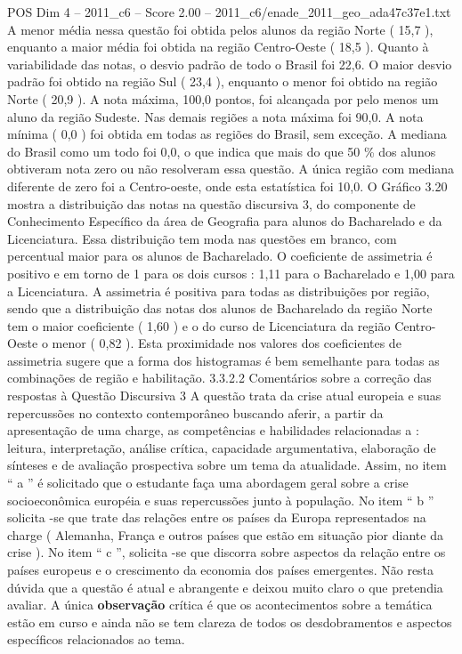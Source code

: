 \begin{textsample}{POS Dim 4 – 2011\_c6 – Score 2.00 – 2011\_c6/enade\_2011\_geo\_ada47c37e1.txt}
A menor média nessa questão foi obtida pelos alunos da região Norte ( 15,7 ), enquanto a maior média foi obtida na região Centro-Oeste ( 18,5 ).
Quanto à variabilidade das notas, o desvio padrão de todo o Brasil foi 22,6.
O maior desvio padrão foi obtido na região Sul ( 23,4 ), enquanto o menor foi obtido na região Norte ( 20,9 ).
A nota máxima, 100,0 pontos, foi alcançada por pelo menos um aluno da região Sudeste.
Nas demais regiões a nota máxima foi 90,0.
A nota mínima ( 0,0 ) foi obtida em todas as regiões do Brasil, sem exceção.
A mediana do Brasil como um todo foi 0,0, o que indica que mais do que 50 \% dos alunos obtiveram nota zero ou não resolveram essa questão.
A única região com mediana diferente de zero foi a Centro-oeste, onde esta estatística foi 10,0.
O Gráfico 3.20 mostra a distribuição das notas na questão discursiva 3, do componente de Conhecimento Específico da área de Geografia para alunos do Bacharelado e da Licenciatura.
Essa distribuição tem moda nas questões em branco, com percentual maior para os alunos de Bacharelado.
O coeficiente de assimetria é positivo e em torno de 1 para os dois cursos : 1,11 para o Bacharelado e 1,00 para a Licenciatura.
A assimetria é positiva para todas as distribuições por região, sendo que a distribuição das notas dos alunos de Bacharelado da região Norte tem o maior coeficiente ( 1,60 ) e o do curso de Licenciatura da região Centro-Oeste o menor ( 0,82 ).
Esta proximidade nos valores dos coeficientes de assimetria sugere que a forma dos histogramas é bem semelhante para todas as combinações de região e habilitação. 3.3.2.2 Comentários sobre a correção das respostas à Questão Discursiva 3 A questão trata da crise atual europeia e suas repercussões no contexto contemporâneo buscando aferir, a partir da apresentação de uma charge, as competências e habilidades relacionadas a : leitura, interpretação, análise crítica, capacidade argumentativa, elaboração de sínteses e de avaliação prospectiva sobre um tema da atualidade.
Assim, no item “ a ” é solicitado que o estudante faça uma abordagem geral sobre a crise socioeconômica européia e suas repercussões junto à população.
No item “ b ” solicita -se que trate das relações entre os países da Europa representados na charge ( Alemanha, França e outros países que estão em situação pior diante da crise ).
No item “ c ”, solicita -se que discorra sobre aspectos da relação entre os países europeus e o crescimento da economia dos países emergentes.
Não resta dúvida que a questão é atual e abrangente e deixou muito claro o que pretendia avaliar.
A única \textbf{observação} crítica é que os acontecimentos sobre a temática estão em curso e ainda não se tem clareza de todos os desdobramentos e aspectos específicos relacionados ao tema.

\end{textsample}
